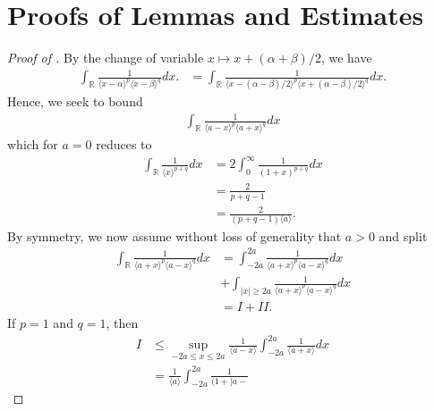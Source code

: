 \documentclass[12pt,reqno]{amsart}
\numberwithin{equation}{section}  %
\renewcommand{\cref}{\Cref}
\newcommand{\rr}{\mathbb{R}}
\begin{document}
\section{Proofs of Lemmas and Estimates} 
\label{sec:pfs-lems-est}
\begin{proof}[Proof of \cref{lem:calc}]
By the change of variable $x \mapsto x + (\alpha + \beta)/2$, we have
\begin{equation*}
\begin{split}
\int_{\rr} \frac{1}{\langle x - \alpha \rangle^{p} \langle  x -
\beta
\rangle^{q}}d x.
& = \int_{\rr} \frac{1}{\langle x - (\alpha - \beta)/2  \rangle^{p}
\langle  x + (\alpha - \beta)/2 \rangle^{q}} d x.
\end{split}
\end{equation*}
Hence, we seek to bound
\begin{equation*}
\begin{split}
\int_{\rr} \frac{1}{\langle a - x \rangle ^{p} \langle a + x \rangle
^{q}} d x
\end{split}
\end{equation*}
which for $a =0$ reduces to 
\begin{equation*}
\begin{split}
\int_{\rr} \frac{1}{\langle x \rangle ^{p+q}} d x 
& = 2 \int_{0}^{\infty} \frac{1}{(1 + x)^{p+q}} d x
\\
& = \frac{2}{p+q -1}
\\
& = \frac{2}{(p+q -1)\langle a \rangle}.
\end{split}
\end{equation*}
By symmetry, we now assume without loss of generality that $a > 0$ and split 
\begin{equation*}
\begin{split}
\int_{\rr} \frac{1}{\langle a + x \rangle ^{p} \langle a - x \rangle
^{q}} d x
& = \int_{-2a}^{2a}
\frac{1}{\langle a + x \rangle ^{p} \langle a - x \rangle
^{q}} d x
\\
& + \int_{| x | \ge 2a} 
\frac{1}{\langle a + x \rangle ^{p} \langle a - x \rangle
^{q}} d x
\\
& = I + II.
\end{split}
\end{equation*}
If $p=1$ and $q=1$, then 
\begin{equation*}
\begin{split}
I
& \le \sup_{-2a \le x \le 2a} \frac{1}{\langle a - x \rangle
} \int_{-2a}^{2a} \frac{1}{\langle a + x \rangle} d x
\\
& = \frac{1}{\langle a \rangle} \int_{-2a}^{2a} \frac{1}{(1 + | a -
}
\end{split}
\end{equation*}
\end{proof}
\end{document}
